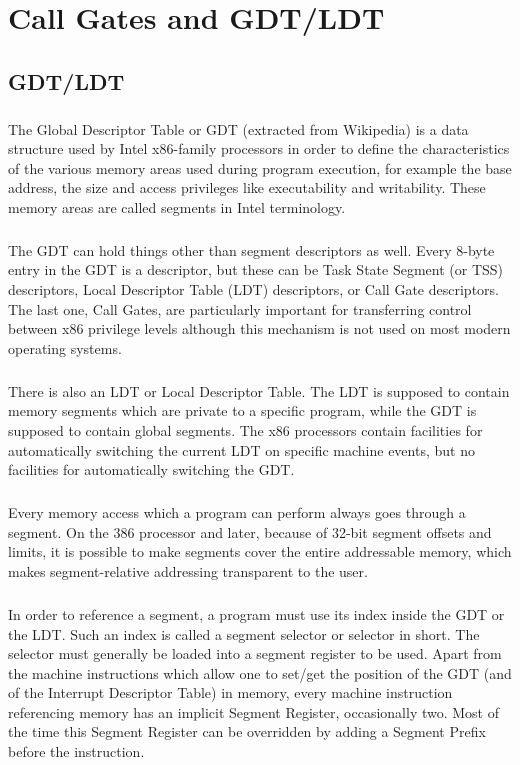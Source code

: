 \documentclass[12pt,a4paper,english]{book}
\newcommand{\ocite}[1]{\footfullcite{#1}}
\newcommand{\paraph}{\paragraph{}}
\begin{document}
\titlespacing*{\chapter}{0pt}{-40pt}{15pt}
\fancyhead[LE,RO]{}
\setcounter{tocdepth}{3}
\tableofcontents
\fancyhead[LE,RO]{\slshape \rightmark}

\chapter{Call Gates and GDT/LDT}

\section{GDT/LDT}
\paraph{}
The Global Descriptor Table or GDT (extracted from Wikipedia\ocite{wikglb2010}) is a data structure used by Intel x86-family processors in order to define the characteristics of the various memory areas used during program execution, for example the base address, the size and access privileges like executability and writability. These memory areas are called segments in Intel terminology. \ocite{Int6432sofdvman3A}

\paraph{}
The GDT can hold things other than segment descriptors as well. Every 8-byte entry in the GDT is a descriptor, but these can be Task State Segment (or TSS) descriptors, Local Descriptor Table (LDT) descriptors, or Call Gate descriptors. The last one, Call Gates, are particularly important for transferring control between x86 privilege levels although this mechanism is not used on most modern operating systems.

\paraph{}
There is also an LDT or Local Descriptor Table. The LDT is supposed to contain memory segments which are private to a specific program, while the GDT is supposed to contain global segments. The x86 processors contain facilities for automatically switching the current LDT on specific machine events, but no facilities for automatically switching the GDT.

\paraph{}
Every memory access which a program can perform always goes through a segment. On the 386 processor and later, because of 32-bit segment offsets and limits, it is possible to make segments cover the entire addressable memory, which makes segment-relative addressing transparent to the user.

\paraph{}
In order to reference a segment, a program must use its index inside the GDT or the LDT. Such an index is called a segment selector or selector in short. The selector must generally be loaded into a segment register to be used. Apart from the machine instructions which allow one to set/get the position of the GDT (and of the Interrupt Descriptor Table) in memory, every machine instruction referencing memory has an implicit Segment Register, occasionally two. Most of the time this Segment Register can be overridden by adding a Segment Prefix before the instruction.
\end{document}
